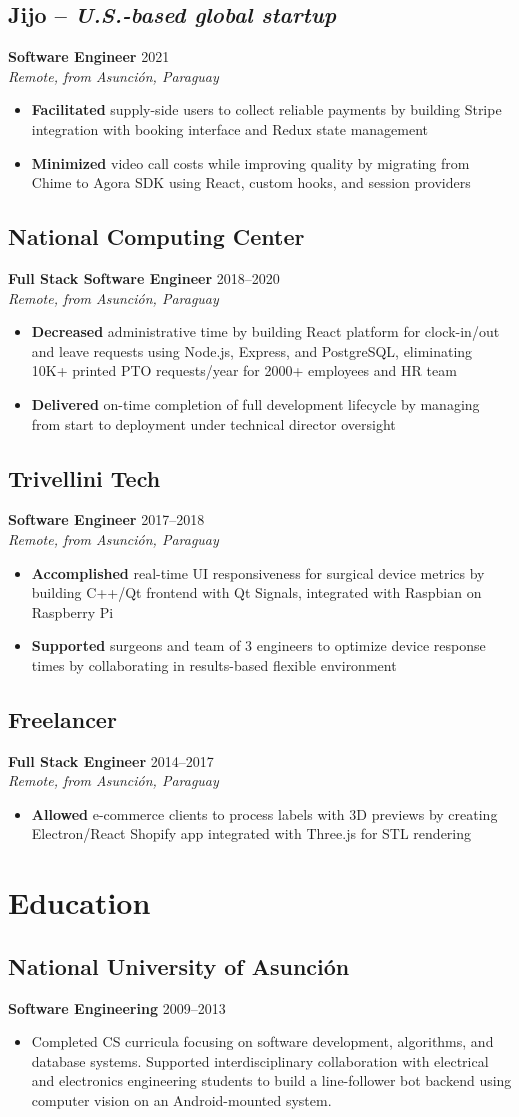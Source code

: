 \documentclass[11pt,a4paper]{article}
\newcommand{\actionverb}[1]{\textcolor{actioncolor}{\textbf{#1}}}
\newcommand{\cvcompany}[3]{
  \subsection{#1 \textcolor{mediumgray}{#2}}
  #3
  \vspace{0.5em}
}
\newcommand{\cvrole}[4]{
  \textbf{#1} \hfill \textcolor{mediumgray}{\small #2}\\
  \textit{#3}
  \begin{itemize}
    #4
  \end{itemize}
  \vspace{1em}
}
\newcommand{\cveducation}[4]{
  \subsection{#1}
  \textbf{#2} \hfill \textcolor{mediumgray}{\small #3}
  \begin{itemize}
    \item #4
  \end{itemize}
}
\begin{document}
\cvcompany{Jijo}{-- \textit{U.S.-based global startup}}{
  \cvrole{Software Engineer}{2021}{Remote, from Asunción, Paraguay}{
    \item \actionverb{Facilitated} supply-side users to collect reliable payments by building Stripe integration with booking interface and Redux state management
    \item \actionverb{Minimized} video call costs while improving quality by migrating from Chime to Agora SDK using React, custom hooks, and session providers
  }
}

\cvcompany{National Computing Center}{}{
  \cvrole{Full Stack Software Engineer}{2018--2020}{Remote, from Asunción, Paraguay}{
    \item \actionverb{Decreased} administrative time by building React platform for clock-in/out and leave requests using Node.js, Express, and PostgreSQL, eliminating 10K+ printed PTO requests/year for 2000+ employees and HR team
    \item \actionverb{Delivered} on-time completion of full development lifecycle by managing from start to deployment under technical director oversight
  }
}

\cvcompany{Trivellini Tech}{}{
  \cvrole{Software Engineer}{2017--2018}{Remote, from Asunción, Paraguay}{
    \item \actionverb{Accomplished} real-time UI responsiveness for surgical device metrics by building C++/Qt frontend with Qt Signals, integrated with Raspbian on Raspberry Pi
    \item \actionverb{Supported} surgeons and team of 3 engineers to optimize device response times by collaborating in results-based flexible environment
  }
}

\cvcompany{Freelancer}{}{
  \cvrole{Full Stack Engineer}{2014--2017}{Remote, from Asunción, Paraguay}{
    \item \actionverb{Allowed} e-commerce clients to process labels with 3D previews by creating Electron/React Shopify app integrated with Three.js for STL rendering
  }
}

\section{Education}

\cveducation{National University of Asunción}{Software Engineering}{2009--2013}{Completed CS curricula focusing on software development, algorithms, and database systems. Supported interdisciplinary collaboration with electrical and electronics engineering students to build a line-follower bot backend using computer vision on an Android-mounted system.}
\end{document}
